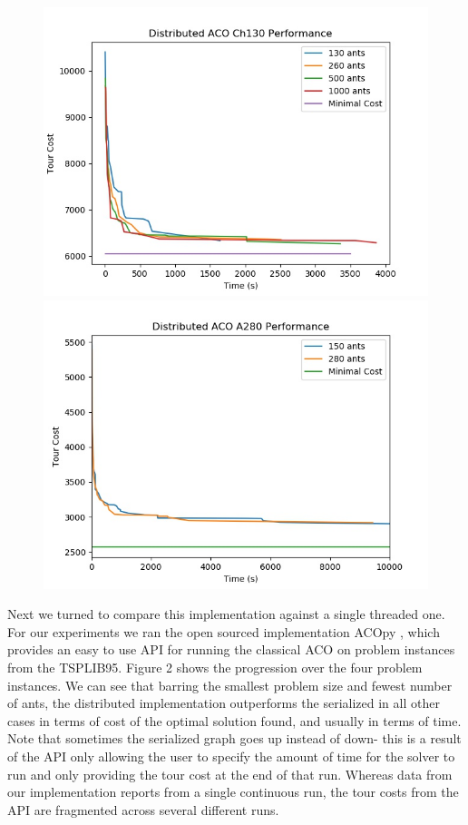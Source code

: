 \documentclass[12pt]{article}
\begin{document}
\begin{figure}
    \includegraphics[scale=0.5]{ch130_performance_vs_ants.jpg}
    \includegraphics[scale=0.5]{a280_performance_vs_ants.jpg}
    \label{fig1}
\end{figure}


Next we turned to compare this implementation against a single threaded one. For our
experiments we ran the open sourced implementation ACOpy \cite{acopy}, which provides 
an easy to use API for running the classical ACO on problem instances from the TSPLIB95.
Figure 2 shows the progression over the four problem instances. We can see that barring 
the smallest problem size and fewest number of ants, the distributed implementation 
outperforms the serialized in all other cases in terms of cost of the optimal 
solution found, and usually in terms of time.
Note that sometimes the serialized graph goes up instead 
of down- this is a result of the API only allowing the user to specify the
amount of time for the solver to run and only providing the tour cost 
at the end of that run. Whereas data from our implementation reports from 
a single continuous run, the tour costs from the API are fragmented across
several different runs. 
\end{document}
